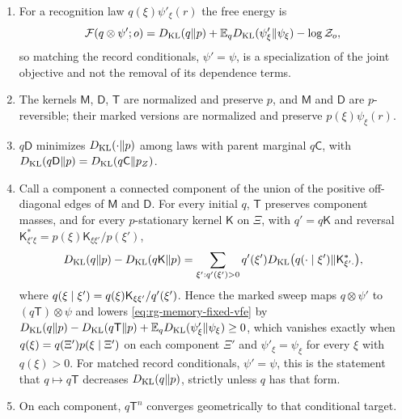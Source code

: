 \begin{enumerate}
\item[(i)] For a recognition law $q(\xi)\psi'_\xi(r)$ the free energy is
\begin{equation}
\mathcal F(q\otimes\psi';o)=D_{\mathrm{KL}}(q\Vert p)+\mathbb E_qD_{\mathrm{KL}}(\psi'_\xi\Vert\psi_\xi)
-\log\mathcal Z_o,
\label{eq:rg-memory-fixed-vfe}
\end{equation}
so matching the record conditionals, $\psi'=\psi$, is a specialization of the
joint objective and not the removal of its dependence terms.
\item[(ii)] The kernels $\mathsf M$, $\mathsf D$, $\mathsf T$ are normalized and
preserve $p$, and $\mathsf M$ and $\mathsf D$ are $p$-reversible; their marked
versions are normalized and preserve $p(\xi)\psi_\xi(r)$.
\item[(iii)] $q\mathsf D$ minimizes $D_{\mathrm{KL}}(\cdot\Vert p)$ among laws with parent
marginal $q\mathsf C$, with $D_{\mathrm{KL}}(q\mathsf D\Vert p)=D_{\mathrm{KL}}(q\mathsf C\Vert p_Z)$.
\item[(iv)] Call a component a connected component of the union of the positive
off-diagonal edges of $\mathsf M$ and $\mathsf D$. For every initial $q$, $\mathsf T$
preserves component masses, and for every $p$-stationary kernel $\mathsf K$ on
$\Xi$, with $q'=q\mathsf K$ and reversal
$\mathsf K^*_{\xi'\xi}=p(\xi)\mathsf K_{\xi\xi'}/p(\xi')$,
\begin{equation}
D_{\mathrm{KL}}(q\Vert p)-D_{\mathrm{KL}}(q\mathsf K\Vert p)
=\sum_{\xi':q'(\xi')>0}q'(\xi')
D_{\mathrm{KL}}\bigl(q(\cdot\mid\xi')\Vert\mathsf K^*_{\xi'\cdot}\bigr),
\label{eq:rg-memory-reverse-conditional-loss}
\end{equation}
where $q(\xi\mid\xi')=q(\xi)\mathsf K_{\xi\xi'}/q'(\xi')$. Hence the marked
sweep maps $q\otimes\psi'$ to $(q\mathsf T)\otimes\psi$ and lowers
\eqref{eq:rg-memory-fixed-vfe} by
$D_{\mathrm{KL}}(q\Vert p)-D_{\mathrm{KL}}(q\mathsf T\Vert p)+\mathbb E_qD_{\mathrm{KL}}(\psi'_\xi\Vert\psi_\xi)\geq0$,
which vanishes exactly when $q(\xi)=q(\Xi')p(\xi\mid\Xi')$ on each component
$\Xi'$ and $\psi'_\xi=\psi_\xi$ for every $\xi$ with $q(\xi)>0$. For matched
record conditionals, $\psi'=\psi$, this is the statement that $q\mapsto q\mathsf T$
decreases $D_{\mathrm{KL}}(q\Vert p)$, strictly unless $q$ has that form.
\item[(v)] On each component, $q\mathsf T^n$ converges geometrically to that
conditional target.
\end{enumerate}


